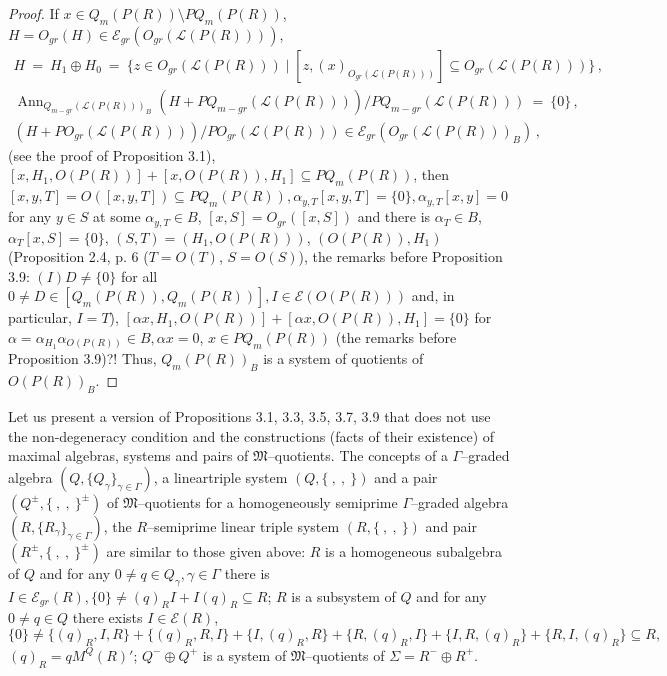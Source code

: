 \documentclass[a4paper,11pt]{article}
\DeclareMathOperator{\Ann}{Ann}
\begin{document}
\begin{proof}
If ${x\in Q_m(P(R))\setminus P Q_m(P(R))}$, 
${H=O_{gr}(H)\in \mathcal{E}_{gr}(O_{gr}(\mathcal{L}(P(R))))}$, 
\begin{gather*}
H\ =\ H_1\oplus H_0\ =\ \{z\in O_{gr}(\mathcal{L}(P(R)))\mid 
[z, (x)_{O_{gr}(\mathcal{L}(P(R)))}]\subseteq O_{gr}(\mathcal{L}(P(R)))\}\,,
\\
\Ann_{Q_{m-gr}(\mathcal{L}(P(R)))_B} (H+P Q_{m-gr}(\mathcal{L}(P(R))))/
P Q_{m-gr}(\mathcal{L}(P(R)))\ =\ \{0\}\,,
\\
(H+P O_{gr}(\mathcal{L}(P(R))))/P O_{gr}(\mathcal{L}(P(R)))\in 
\mathcal{E}_{gr}(O_{gr}(\mathcal{L}(P(R)))_B)\,,
\end{gather*}
(see the proof of Proposition 3.1), 
${[x, H_1, O(P(R))]+[x, O(P(R)), H_1]\subseteq P Q_m(P(R))}$, then 
${[x, y, T]=O([x, y, T])\subseteq P Q_m(P(R)), 
\alpha_{y, T} [x, y, T]=\{0\}, \alpha_{y, T} [x, y]=0}$
for any ${y\in S}$ at some ${\alpha_{y, T}\in B}$, 
${[x, S]=O_{gr}([x, S])}$ and there is ${\alpha_T\in B}$,
${\alpha_T [x, S]=\{0\}}$, ${(S, T)=(H_1, O(P(R)))}$, ${(O(P(R)), H_1)}$ 
(Proposition 2.4, p. 6 (${T=O(T)}$, ${S=O(S)}$),  
the remarks before Proposition 3.9: ${(I)D\ne \{0\}}$ 
for all ${0\ne D\in [Q_m(P(R)), Q_m(P(R))], I\in \mathcal{E}(O(P(R)))}$ 
and, in particular, ${I=T}$), 
${[\alpha x, H_1, O(P(R))]+[\alpha x, O(P(R)), H_1]=\{0\}}$ for 
${\alpha=\alpha_{H_1} \alpha_{O(P(R))}\in B, \alpha x=0}$, 
$x\in P Q_m(P(R))$ (the remarks before Proposition 3.9)?! Thus, 
$Q_m(P(R))_B$ is a system of quotients of $O(P(R))_B$.
\end{proof}

Let us present a version of Propositions 3.1, 3.3, 3.5, 3.7, 3.9 that does not 
use the non-degeneracy condition and the constructions (facts of their existence) 
of maximal algebras, systems and pairs of $\mathfrak{M}$--quotients. The 
concepts of a $\Gamma$--graded algebra 
${(Q, \{Q_{\gamma}\}_{\gamma\in \Gamma})}$, a linear\linebreak triple system 
${(Q, \{\ ,\ ,\ \})}$ and a pair ${(Q^{\pm}, \{\ ,\ ,\ \}^{\pm})}$ of 
$\mathfrak{M}$--quotients for a homogeneously semiprime 
$\Gamma$--graded algebra ${(R, \{R_{\gamma}\}_{\gamma\in \Gamma})}$, the  
$R$--semiprime linear triple system ${(R, \{\ ,\ ,\ \})}$ and pair 
${(R^{\pm}, \{\ ,\ ,\ \}^{\pm})}$ are similar to those given above: 
$R$ is a homogeneous subalgebra of $Q$ and for any 
${0\ne q\in Q_{\gamma}, \gamma\in \Gamma}$ there is 
${I\in \mathcal{E}_{gr}(R), \{0\}\ne (q)_R I+I (q)_R\subseteq R}$; $R$ is a 
subsystem of $Q$ and for any ${0\ne q\in Q}$ there exists 
${I\in \mathcal{E}(R)}$, 
\[
\{0\}\ne \{(q)_R, I, R\}+\{(q)_R, R, I\}+\{I, (q)_R, R\}+
\{R, (q)_R, I\}+\{I, R, (q)_R\}+\{R, I, (q)_R\}\subseteq R, 
\]
${(q)_R=q M^Q(R)'}$; ${Q^{-}\oplus Q^{+}}$ is a system of 
$\mathfrak{M}$--quotients of ${\Sigma=R^{-}\oplus R^{+}}$. 
\end{document}
